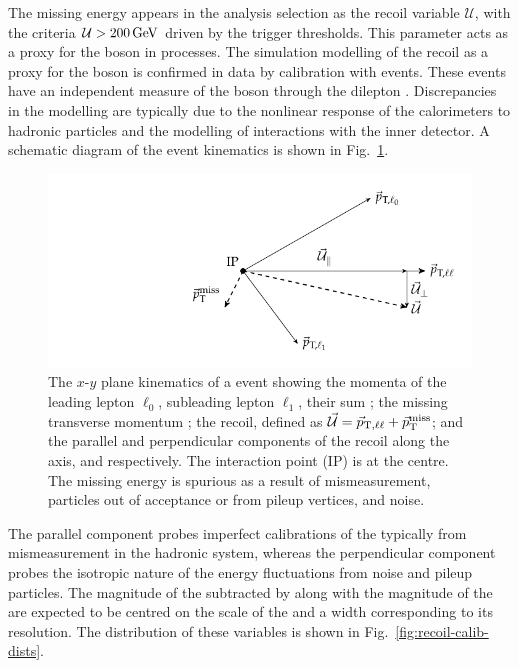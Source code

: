 The missing energy appears in the analysis selection as the recoil variable $\mathcal{U}$, with the criteria ${\mathcal{U}>\SI{200}{GeV}}$ driven by the trigger thresholds. This parameter acts as a proxy for the boson \pt in \IVj processes. The simulation modelling of the recoil as a proxy for the boson \pt is confirmed in data by calibration with \diellplusjets events. These events have an independent measure of the boson \pt through the dilepton \pt. Discrepancies in the modelling are typically due to the nonlinear response of the calorimeters to hadronic particles and the modelling of interactions with the inner detector. A schematic diagram of the event kinematics is shown in Fig.~\ref{fig:recoil-calib-diagram}.

\begin{figure}[htb]
    \centering
    \includegraphics{diagrams/tikz/recoil_calib/recoil_calib.pdf}
    \caption[Kinematics diagram of a \IDYllj events.]{
        The $x$-$y$ plane kinematics of a \IDYllj event showing the momenta of the leading lepton $\ell_0$, subleading lepton $\ell_1$, their sum \vecptll; the missing transverse momentum \vecptmiss; the recoil, defined as $\vec{\mathcal{U}}=\vec{p}_{\mathrm{T},\ell\ell}+\vec{p}_{\text{T}}^{\mathrm{miss}}$; and the parallel and perpendicular components of the recoil along the \vecptll axis, \vecrecoilpara and \vecrecoilperp respectively. The interaction point (IP) is at the centre. The missing energy is spurious as a result of mismeasurement, particles out of acceptance or from pileup vertices, and noise.
    }
    \label{fig:recoil-calib-diagram}
\end{figure}

The parallel component \vecrecoilpara probes imperfect calibrations of the \ptmiss typically from mismeasurement in the hadronic system, whereas the perpendicular component \vecrecoilperp probes the isotropic nature of the energy fluctuations from noise and pileup particles. The magnitude of the \vecrecoilpara subtracted by \vecptll along with the magnitude of the \vecrecoilperp are expected to be centred on the scale of the \ptmiss and a width corresponding to its resolution. The distribution of these variables is shown in Fig.~\ref{fig:recoil-calib-dists}.

